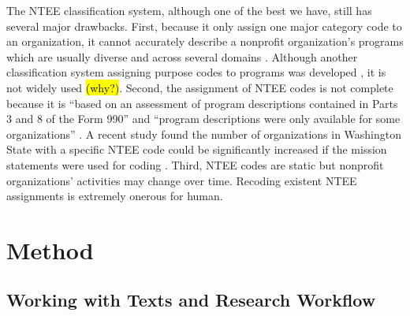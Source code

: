 \documentclass[12pt]{article}
\begin{document}
The NTEE classification system, although one of the best we have, still has several major drawbacks. First, because it only assign one major category code to an organization, it cannot accurately describe a nonprofit organization's programs which are usually diverse and across several domains \parencite[303]{GronbjergUsingNTEEclassify1994}. Although another classification system assigning purpose codes to programs was developed \parencite{LampkinIntroducingNonprofitProgram2001}, it is not widely used \hl{(why?)}. Second, the assignment of NTEE codes is not complete because it is ``based on an assessment of program descriptions contained in Parts 3 and 8 of the Form 990'' and ``program descriptions were only available for some organizations'' \parencite[16]{NationalCenterforCharitableStatisticsGuideUsingNCCS2006}. A recent study found the number of organizations in Washington State with a specific NTEE code could be significantly increased if the mission statements were used for coding \parencite{FyallNTEECodesOpportunities2018}. Third, NTEE codes are static but nonprofit organizations' activities may change over time. Recoding existent NTEE assignments is extremely onerous for human.



\section{Method}

\subsection{Working with Texts and Research Workflow}
\end{document}
